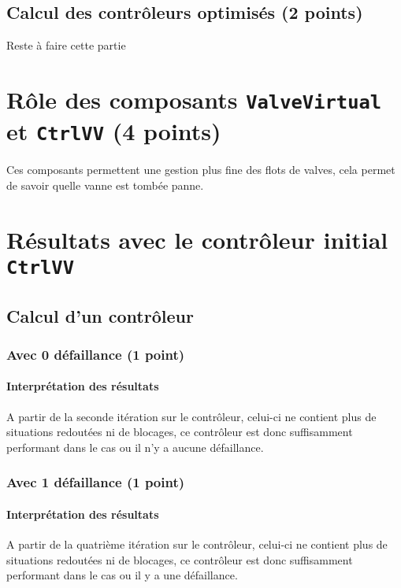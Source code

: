 \documentclass[a4paper]{book}
\begin{document}
\subsection{Calcul des contrôleurs optimisés (2 points)}
Reste à faire cette partie

\section{Rôle des composants {\tt ValveVirtual} et {\tt CtrlVV} (4 points)}
Ces composants permettent une gestion plus fine des flots de valves, cela permet de savoir quelle vanne est tombée panne.

\section{Résultats avec le contrôleur initial {\tt CtrlVV}}

\subsection{Calcul d'un contrôleur}

\subsubsection{Avec 0 défaillance (1 point)}





\paragraph{Interprétation des résultats}
A partir de la seconde itération sur le contrôleur, celui-ci ne contient plus de situations redoutées ni de blocages, ce contrôleur est donc suffisamment performant dans le cas ou il n'y a aucune défaillance.

\subsubsection{Avec 1 défaillance (1 point)}





\paragraph{Interprétation des résultats}
A partir de la quatrième itération sur le contrôleur, celui-ci ne contient plus de situations redoutées ni de blocages, ce contrôleur est donc suffisamment performant dans le cas ou il y a une défaillance.
\end{document}
